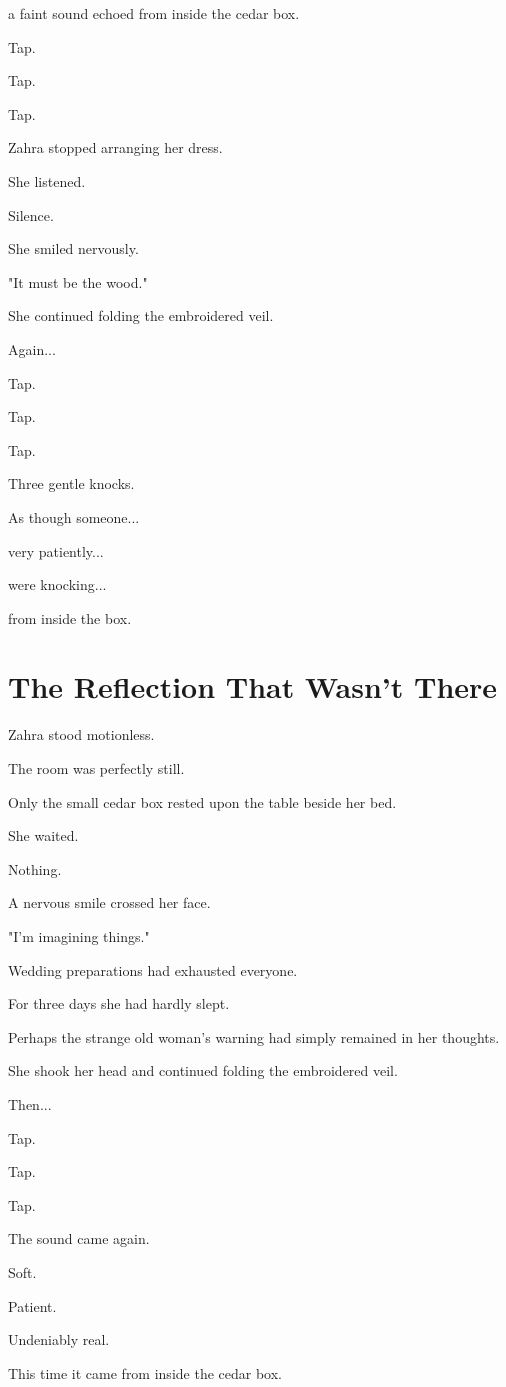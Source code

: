 \documentclass[12pt,openany]{book}
\begin{document}
a faint sound echoed from inside the cedar box.

Tap.

Tap.

Tap.

Zahra stopped arranging her dress.

She listened.

Silence.

She smiled nervously.

"It must be the wood."

She continued folding the embroidered veil.

Again...

Tap.

Tap.

Tap.

Three gentle knocks.

As though someone...

very patiently...

were knocking...

from inside the box.
\section*{The Reflection That Wasn't There}

Zahra stood motionless.

The room was perfectly still.

Only the small cedar box rested upon the table beside her bed.

She waited.

Nothing.

A nervous smile crossed her face.

"I'm imagining things."

Wedding preparations had exhausted everyone.

For three days she had hardly slept.

Perhaps the strange old woman's warning had simply remained in her thoughts.

She shook her head and continued folding the embroidered veil.

Then...

Tap.

Tap.

Tap.

The sound came again.

Soft.

Patient.

Undeniably real.

This time it came from inside the cedar box.
\end{document}
